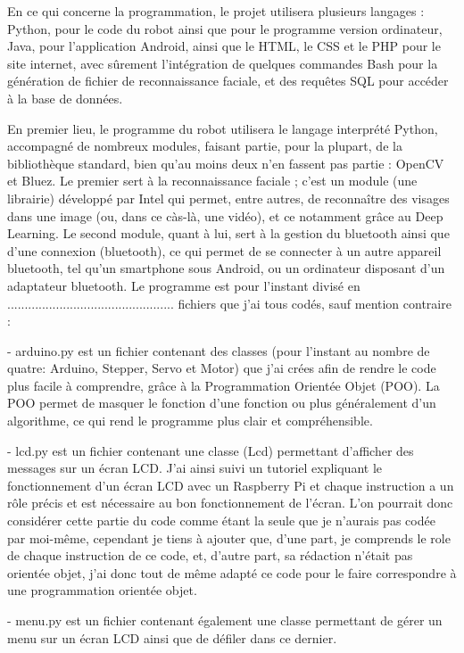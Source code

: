 \documentclass[12pt,a4paper]{article}
\begin{document}
	\indent\indent En ce qui concerne la programmation, le projet utilisera plusieurs langages : Python, pour le code du robot ainsi que pour le programme version ordinateur, Java, pour l'application Android, ainsi que le HTML, le CSS et le PHP pour le site internet, avec sûrement l'intégration de quelques commandes Bash pour la génération de fichier de reconnaissance faciale, et des requêtes SQL pour accéder à la base de données.
	
	En premier lieu, le programme du robot utilisera le langage interprété Python, accompagné de nombreux modules, faisant partie, pour la plupart, de la bibliothèque standard, bien qu'au moins deux n'en fassent pas partie \nolinebreak : OpenCV et Bluez. Le premier sert à la reconnaissance faciale ; c'est un module (une librairie) développé par Intel qui permet, entre autres, de reconnaître des visages dans une image (ou, dans ce càs-là, une vidéo), et ce notamment grâce au Deep Learning. Le second module, quant à lui, sert à la gestion du bluetooth ainsi que d'une connexion (bluetooth), ce qui permet de se connecter à un autre appareil bluetooth, tel qu'un smartphone sous Android, ou un ordinateur disposant d'un adaptateur bluetooth. Le programme est pour l'instant divisé en ................................................ fichiers que j'ai tous codés, sauf mention contraire :
	
	- arduino.py est un fichier contenant des classes (pour l'instant au nombre de quatre: Arduino, Stepper, Servo et Motor) que j'ai crées afin de rendre le code plus facile à comprendre, grâce à la Programmation Orientée Objet (POO). La POO permet de masquer le fonction d'une fonction ou plus généralement d'un algorithme, ce qui rend le programme plus clair et compréhensible.
	
	- lcd.py est un fichier contenant une classe (Lcd) permettant d'afficher des messages sur un écran LCD. J'ai ainsi suivi un tutoriel expliquant le fonctionnement d'un écran LCD avec un Raspberry Pi et chaque instruction a un rôle précis et est nécessaire au bon fonctionnement de l'écran. L'on pourrait donc considérer cette partie du code comme étant la seule que je n'aurais pas codée par moi-même, cependant je tiens à ajouter que, d'une part, je comprends le role de chaque instruction de ce code, et, d'autre part, sa rédaction n'était pas orientée objet, j'ai donc tout de même adapté ce code pour le faire correspondre à une programmation orientée objet.
	
	- menu.py est un fichier contenant également une classe permettant de gérer un menu sur un écran LCD ainsi que de défiler dans ce dernier.
	
\end{document}
